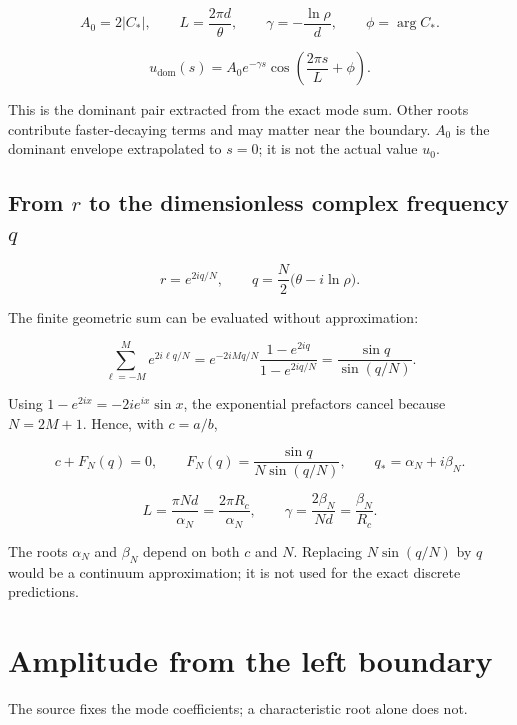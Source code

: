 \documentclass[10pt,a4paper]{article}
\newcommand{\subtitle}[1]{%
  {\small\color{muted}#1\par}\medskip}
\newcommand{\smallnote}[1]{%
  {\small #1\par}}
\begin{document}
\begin{equation}
\boxed{
A_0=2|C_*|,
\qquad
L=\frac{2\pi d}{\theta},
\qquad
\gamma=-\frac{\ln\rho}{d},
\qquad
\phi=\arg C_*.
}
\end{equation}

\begin{equation}
u_{\mathrm{dom}}(s)
=
A_0 e^{-\gamma s}
\cos\left(\frac{2\pi s}{L}+\phi\right).
\end{equation}

This is the dominant pair extracted from the exact
mode sum.
Other roots contribute faster-decaying terms and may
matter near the boundary.
$A_0$ is the dominant envelope extrapolated to $s=0$;
it is not the actual value $u_0$.

\subsection*{From $r$ to the dimensionless complex frequency $q$}

\begin{equation}
r=e^{2iq/N},
\qquad
q=\frac{N}{2}\bigl(\theta-i\ln\rho\bigr).
\end{equation}

The finite geometric sum can be evaluated
without approximation:

\begin{equation}
\sum_{\ell=-M}^{M}e^{2i\ell q/N}
=
e^{-2iMq/N}
\frac{1-e^{2iq}}{1-e^{2iq/N}}
=
\frac{\sin q}{\sin(q/N)}.
\end{equation}

Using $1-e^{2ix}=-2i e^{ix}\sin x$,
the exponential prefactors cancel because $N=2M+1$.
Hence, with $c=a/b$,

\begin{equation}
c+F_N(q)=0,
\qquad
F_N(q)=\frac{\sin q}{N\sin(q/N)},
\qquad
q_*=\alpha_N+i\beta_N.
\end{equation}

\begin{equation}
\boxed{
L=\frac{\pi Nd}{\alpha_N}
 =\frac{2\pi R_c}{\alpha_N},
\qquad
\gamma=\frac{2\beta_N}{Nd}
      =\frac{\beta_N}{R_c}.
}
\end{equation}

\smallnote{
The roots $\alpha_N$ and $\beta_N$ depend on both $c$
and $N$.
Replacing $N\sin(q/N)$ by $q$ would be a continuum
approximation; it is not used for the exact
discrete predictions.
}

\clearpage
\section{Amplitude from the left boundary}
\subtitle{The source fixes the mode coefficients;
a characteristic root alone does not.}
\end{document}
